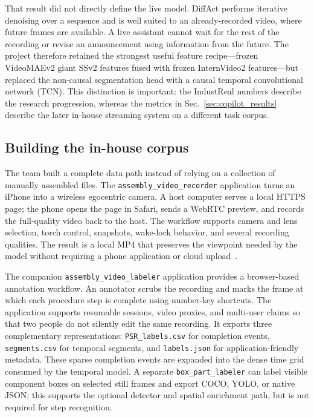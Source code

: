 \documentclass[11pt]{article}
\begin{document}
That result did not directly define the live model. DiffAct performs iterative denoising over a sequence and is
well suited to an already-recorded video, where future frames are available. A live assistant cannot wait for the
rest of the recording or revise an announcement using information from the future. The project therefore retained
the strongest useful feature recipe---frozen VideoMAEv2 giant SSv2 features fused with frozen InternVideo2
features---but replaced the non-causal segmentation head with a causal temporal convolutional network (TCN).
This distinction is important: the IndustReal numbers describe the research progression, whereas the metrics in
Sec.~\ref{sec:copilot_results} describe the later in-house streaming system on a different task corpus.

\subsection{Building the in-house corpus}
\label{sec:custom_data}

The team built a complete data path instead of relying on a collection of manually assembled files. The
\texttt{assembly\_video\_recorder} application turns an iPhone into a wireless egocentric camera. A host computer
serves a local HTTPS page; the phone opens the page in Safari, sends a WebRTC preview, and records the full-quality
video back to the host. The workflow supports camera and lens selection, torch control, snapshots, wake-lock
behavior, and several recording qualities. The result is a local MP4 that preserves the viewpoint needed by the
model without requiring a phone application or cloud upload~\cite{copilottools}.

The companion \texttt{assembly\_video\_labeler} application provides a browser-based annotation workflow. An
annotator scrubs the recording and marks the frame at which each procedure step is complete using number-key
shortcuts. The application supports resumable sessions, video proxies, and multi-user claims so that two people do
not silently edit the same recording. It exports three complementary representations:
\texttt{PSR\_labels.csv} for completion events, \texttt{segments.csv} for temporal segments, and
\texttt{labels.json} for application-friendly metadata. These sparse completion events are expanded into the dense
time grid consumed by the temporal model. A separate \texttt{box\_part\_labeler} can label visible component boxes
on selected still frames and export COCO, YOLO, or native JSON; this supports the optional detector and spatial
enrichment path, but is not required for step recognition.
\end{document}
